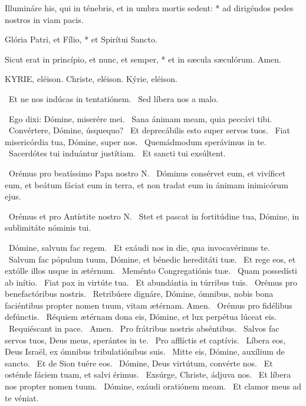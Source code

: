 Illumináre his, qui in ténebris, et in umbra mortis sedent: * ad dirigéndos pedes nostros in viam pacis.

Glória Patri, et Fílio, * et Spirítui Sancto.

Sicut erat in princípio, et nunc, et semper, * et in sæcula sæculórum. Amen.




KYRIE, eléison. Christe, eléison. Kýrie, eléison.

 \V\ Et ne nos indúcas in tentatiónem. \R\ Sed líbera nos a malo.

\V\ Ego dixi: Dómine, miserére mei. \R\ Sana ánimam meam, quia peccávi tibi. \V\ Convértere, Dómine, úsquequo? \R\ Et deprecábilis esto super servos tuos. \V\ Fiat misericórdia tua, Dómine, super nos. \R\ Quemádmodum sperávimus in te. \V\ Sacerdótes tui induántur justítiam. \R\ Et sancti tui exsúltent.

\V\ Orémus pro beatíssimo Papa nostro N. \R\ Dóminus consérvet eum, et vivíficet eum, et beátum fáciat eum in terra, et non tradat eum in ánimam inimicórum ejus.

\V\ Orémus et pro Antístite nostro N. \R\ Stet et pascat in fortitúdine tua, Dómine, in sublimitáte nóminis tui.


\V\ Dómine, salvum fac regem. \R\ Et exáudi nos in die, qua invocavérimus te. \V\ Salvum fac pópulum tuum, Dómine, et bénedic hereditáti tuæ. \R\ Et rege eos, et extólle illos usque in ætérnum. \V\ Meménto Congregatiónis tuæ. \R\ Quam possedísti ab inítio. \V\ Fiat pax in virtúte tua. \R\ Et abundántia in túrribus tuis. \V\ Orémus pro benefactóribus nostris. \R\ Retribúere dignáre, Dómine, ómnibus, nobis bona faciéntibus propter nomen tuum, vitam ætérnam. Amen. \V\ Orémus pro fidélibus defúnctis. \R\ Réquiem ætérnam dona eis, Dómine, et lux perpétua lúceat eis. \V\ Requiéscant in pace. \R\ Amen. \V\ Pro frátribus nostris abséntibus. \R\ Salvos fac servos tuos, Deus meus, sperántes in te. \V\ Pro afflíctis et captívis. \R\ Líbera eos, Deus Israël, ex ómnibus tribulatiónibus suis. \V\ Mitte eis, Dómine, auxílium de sancto. \R\ Et de Sion tuére eos. \V\ Dómine, Deus virtútum, convérte nos. \R\ Et osténde fáciem tuam, et salvi érimus. \V\ Exsúrge, Christe, ádjuva nos. \R\ Et líbera nos propter nomen tuum. \V\ Dómine, exáudi oratiónem meam. \R\ Et clamor meus ad te véniat.

